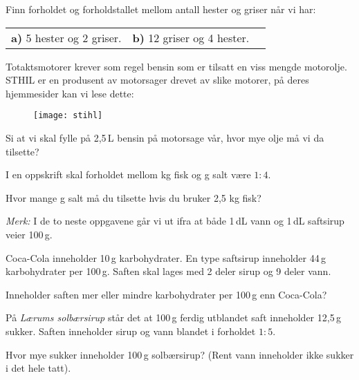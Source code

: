 



\opgt

\nes
{}
Finn forholdet og forholdstallet mellom antall hester og griser når vi har:\os
\begin{tabular}{@{}l l l}	
\textbf{a)} 5 hester og 2 griser. &\textbf{b)} 12 griser og 4 hester.
\end{tabular}

Totaktsmotorer krever som regel bensin som er tilsatt en viss mengde motorolje. STHIL er en produsent av motorsager drevet av slike motorer, på deres hjemmesider kan vi lese dette:
\begin{figure}
	\texttt{[image: stihl]}
\end{figure}
Si at vi skal fylle på 2,5\,L bensin på motorsage vår, hvor mye olje må vi da tilsette?

I en oppskrift skal forholdet mellom kg fisk og g salt være $ 1:4 $.\os 

Hvor mange g salt må du tilsette hvis du bruker 2,5 kg fisk? \vsk \vspace{12pt}

\textsl{Merk:} I de to neste oppgavene går vi ut ifra at både 1\,dL vann og 1\,dL saftsirup veier 100\,g.

Coca-Cola inneholder 10\,g karbohydrater. En type saftsirup inneholder 44\,g karbohydrater per 100\,g. Saften skal lages med 2 deler sirup og 9 deler vann. \os

Inneholder saften mer eller mindre karbohydrater per 100\,g enn Coca-Cola?

På \textsl{Lærums solbærsirup} står det at 100\,g ferdig utblandet saft inneholder 12,5\,g sukker. Saften inneholder sirup og vann blandet i forholdet $ {1:5} $. \os

Hvor mye sukker inneholder 100\,g solbærsirup? (Rent vann inneholder ikke sukker i det hele tatt).



